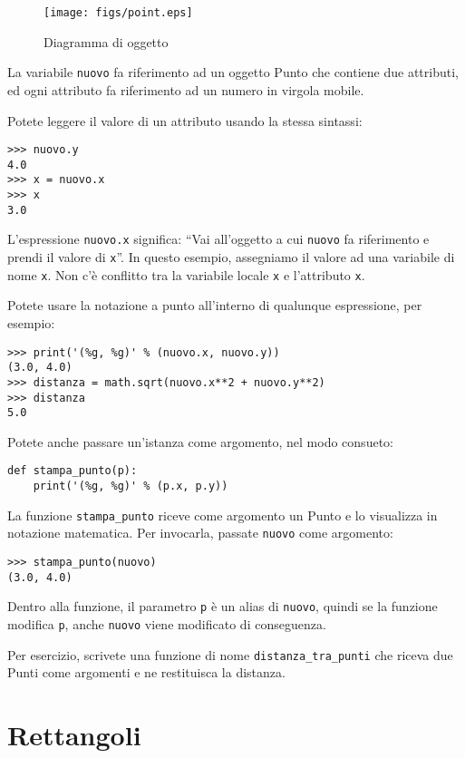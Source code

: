 \documentclass[10pt]{book}
\begin{document}
\begin{figure}
\centerline
{\texttt{[image: figs/point.eps]}}
\caption{Diagramma di oggetto}
\label{fig.point}
\end{figure}


La variabile {\tt nuovo} fa riferimento ad un oggetto Punto che contiene due
   attributi, ed ogni attributo fa riferimento ad un numero in virgola mobile.

Potete leggere il valore di un attributo usando la stessa sintassi:

\begin{verbatim}
>>> nuovo.y
4.0
>>> x = nuovo.x
>>> x
3.0
\end{verbatim}
%
L'espressione {\tt nuovo.x} significa: ``Vai all'oggetto a cui {\tt nuovo}
fa riferimento e prendi il valore di {\tt x}''. In questo esempio, assegniamo il valore ad una variabile di nome {\tt x}. Non c'è conflitto tra la variabile locale {\tt x} e l'attributo {\tt x}.

Potete usare la notazione a punto all'interno di qualunque espressione, per esempio:

\begin{verbatim}
>>> print('(%g, %g)' % (nuovo.x, nuovo.y))
(3.0, 4.0)
>>> distanza = math.sqrt(nuovo.x**2 + nuovo.y**2)
>>> distanza
5.0
\end{verbatim}
%
Potete anche passare un'istanza come argomento, nel modo consueto:

\begin{verbatim}
def stampa_punto(p):
    print('(%g, %g)' % (p.x, p.y))
\end{verbatim}
%
La funzione \verb"stampa_punto" riceve come argomento un Punto e lo visualizza in notazione matematica. Per invocarla, passate {\tt nuovo} come argomento:

\begin{verbatim}
>>> stampa_punto(nuovo)
(3.0, 4.0)
\end{verbatim}
%
Dentro alla funzione, il parametro {\tt p} è un alias di {\tt nuovo}, quindi se la funzione modifica {\tt p}, anche {\tt nuovo} viene modificato di conseguenza.

Per esercizio, scrivete una funzione di nome \verb"distanza_tra_punti" che riceva due Punti come argomenti e ne restituisca la distanza.


\section{Rettangoli}
\label{rectangles}
\end{document}
